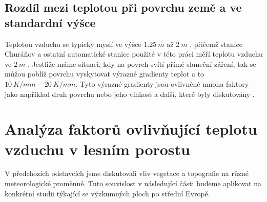 
\subsection{Rozdíl mezi teplotou při povrchu země a ve standardní výšce}
Teplotou vzduchu se typicky myslí ve výšce $\SI{1.25}{m}$ až $\SI{2}{m}$ \parencite{wmo2021}, přičemž stanice Churáňov a ostatní automatické stanice použité v této práci měří teplotu vzduchu ve $\SI{2}{m}$ \parencite{churanov}. Jestliže máme situaci, kdy na povrch svítí přímé sluneční záření, tak se můžou poblíž povrchu vyskytovat výrazné gradienty teplot a to $\SI{10}{K/mm}-\SI{20}{K/mm}$. Tyto výrazné gradienty jsou ovlivněné mnoha faktory jako například druh povrchu nebo jeho vlhkost a další, které byly diskutovány \parencite{arya2001}. 

\section{Analýza faktorů ovlivňující teplotu vzduchu v lesním porostu}
V předchozích odstavcích jsme diskutovali vliv vegetace a topografie na různé meteorologické proměnné. Tuto souvislost v následující části budeme aplikovat na konkrétní studii týkající se výzkumných ploch po střední Evropě.

